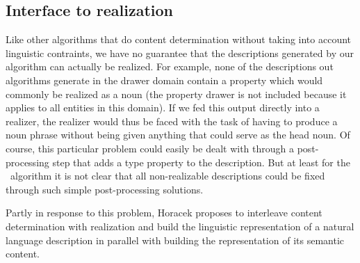 \subsection{Interface to realization}



Like other algorithms that do content determination without taking
into account linguistic contraints, we have no guarantee that the
descriptions generated by our algorithm can actually be realized. For
example, none of the descriptions out algorithms generate in the
drawer domain contain a property which would commonly be realized as a
noun (the property \textsf{drawer} is not included because it applies
to all entities in this domain). If we fed this output directly into a
realizer, the realizer would thus be faced with the task of having to
produce a noun phrase without being given anything that could serve as
the head noun. Of course, this particular problem could easily be
dealt with through a post-processing step that adds a type property to
the description. But at least for the \alc\ algorithm it is not clear
that all non-realizable descriptions could be fixed through such
simple post-processing solutions.


Partly in response to this problem, Horacek \shortcite{} proposes to
interleave content determination with realization and build the
linguistic representation of a natural language description in
parallel with building the representation of its semantic content.



